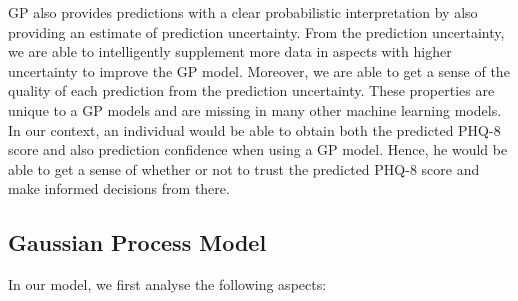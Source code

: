 \documentclass{article}
\begin{document}
GP also provides predictions with a clear probabilistic interpretation by also providing an estimate of prediction uncertainty. From the prediction uncertainty, we are able to intelligently supplement more data in aspects with higher uncertainty to improve the GP model. Moreover, we are able to get a sense of the quality of each prediction from the prediction uncertainty. These properties are unique to a GP models and are missing in many other machine learning
	models. In our context, an individual would be able to obtain both the predicted PHQ-8 score and also prediction confidence when using a GP model. Hence, he would be able to get a
	sense of whether or not to trust the predicted PHQ-8 score and make informed decisions from there.\\
	
	\subsection{Gaussian Process Model}\label{audio_feats}
	In our model, we first analyse the following aspects:
\end{document}
